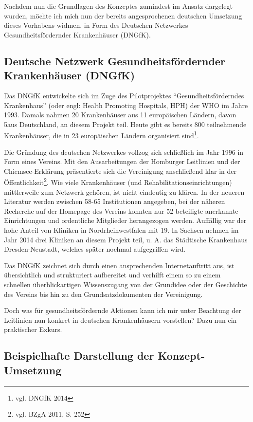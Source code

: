 Nachdem nun die Grundlagen des Konzeptes zumindest im Ansatz dargelegt wurden, möchte ich mich nun der bereits angesprochenen deutschen Umsetzung dieses Vorhabens widmen, in Form des Deutschen Netzwerkes Gesundheitsfördernder Krankenhäuser (DNGfK).

\subsection{Deutsche Netzwerk Gesundheitsfördernder Krankenhäuser (DNGfK)}
\label{sec:DeutscheNetzwerkGesundheitsfördernderKrankenhäuserDNGfK}

Das DNGfK entwickelte sich im Zuge des Pilotprojektes "`Gesundheitsförderndes Krankenhaus"' (oder engl: Health Promoting Hospitals, HPH) der WHO im Jahre 1993. Damals nahmen 20 Krankenhäuser aus 11 europäischen Ländern, davon 5aus Deutschland, an diesem Projekt teil. Heute gibt es bereits 800 teilnehmende Krankenhäuser, die in 23 europäischen Ländern organisiert sind\footnote{vgl. DNGfK 2014}.

Die Gründung des deutschen Netzwerkes vollzog sich schließlich im Jahr 1996 in Form eines Vereins. Mit den Ausarbeitungen der Homburger Leitlinien und der Chiemsee-Erklärung präsentierte sich die Vereinigung anschließend klar in der Öffentlichkeit\footnote{vgl. BZgA 2011, S. 252}. Wie viele Krankenhäuser (und Rehabilitationseinrichtungen) mittlerweile zum Netzwerk gehören, ist nicht eindeutig zu klären. In der neueren Literatur werden zwischen 58-65 Institutionen angegeben, bei der näheren Recherche auf der Homepage des Vereins konnten nur 52 beteiligte anerkannte Einrichtungen und ordentliche Mitglieder herangezogen werden. Auffällig war der hohe Anteil von Kliniken in Nordrheinwestfalen mit 19. In Sachsen nehmen im Jahr 2014 drei Kliniken an diesem Projekt teil, u. A. das Städtische Krankenhaus Dresden-Neustadt, welches später nochmal aufgegriffen wird.

Das DNGfK zeichnet sich durch einen ansprechenden Internetauftritt aus, ist übersichtlich und strukturiert aufbereitet und verhilft einem so zu einem schnellen überblickartigen Wissenszugang von der Grundidee oder der Geschichte des Vereins bis hin zu den Grundsatzdokumenten der Vereinigung.

Doch was für gesundheitsfördernde Aktionen kann ich mir unter Beachtung der Leitlinien nun konkret in deutschen Krankenhäusern vorstellen? Dazu nun ein praktischer Exkurs.

\subsection{Beispielhafte Darstellung der Konzept-Umsetzung }
\label{sec:BeispielhafteDarstellungDerKonzeptUmsetzung}

